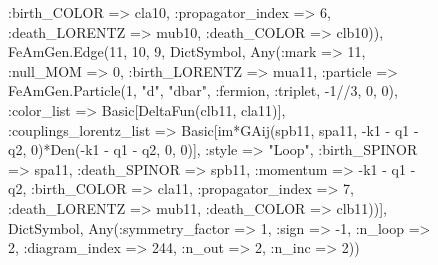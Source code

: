 \documentclass{revtex4}
\begin{document}
\begin{figure}[!htb]
\begin{center}
{:birth_COLOR => cla10, :propagator_index => 6, :death_LORENTZ => mub10, :death_COLOR => clb10)), FeAmGen.Edge(11, 10, 9, Dict{Symbol, Any}(:mark => 11, :null_MOM => 0, :birth_LORENTZ => mua11, :particle => FeAmGen.Particle(1, "d", "dbar", :fermion, :triplet, -1//3, 0, 0), :color_list => Basic[DeltaFun(clb11, cla11)], :couplings_lorentz_list => Basic[im*GAij(spb11, spa11, -k1 - q1 - q2, 0)*Den(-k1 - q1 - q2, 0, 0)], :style => "Loop", :birth_SPINOR => spa11, :death_SPINOR => spb11, :momentum => -k1 - q1 - q2, :birth_COLOR => cla11, :propagator_index => 7, :death_LORENTZ => mub11, :death_COLOR => clb11))], Dict{Symbol, Any}(:symmetry_factor => 1, :sign => -1, :n_loop => 2, :diagram_index => 244, :n_out => 2, :n_inc => 2)) 
}
\end{center}
\end{figure}
\end{document}
